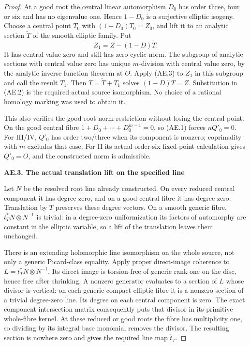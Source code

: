\begin{proof}
At a good root the central linear automorphism \(D_0\) has
order three, four or six and has no eigenvalue one. Hence
\(1-D_0\) is a surjective elliptic isogeny. Choose a central
point \(T_0\) with
\((1-D_0)T_0=Z_0\), and lift it to an analytic section
\(\widetilde T\) of the smooth elliptic family. Put
\[
 Z_1=Z-(1-D)\widetilde T.
\]
It has central value zero and still has zero cyclic norm.
The subgroup of analytic sections with central value zero has
unique \(m\)-division with central value zero, by the analytic
inverse function theorem at \(O\). Apply (AE.3) to \(Z_1\)
in this subgroup and call the result \(T_1\). Then
\(T=\widetilde T+T_1\) solves \((1-D)T=Z\). Substitution
in (AE.2) is the required actual source isomorphism. No choice
of a rational homology marking was used to obtain it.

This also verifies the good-root norm restriction without losing
the central point. On the good central fibre
\(1+D_0+\cdots+D_0^{m-1}=0\), so (AE.1) forces
\(nQ'_0=0\). For III/IV, \(Q'_0\) has order two/three
when its component is nonzero; coprimality with \(m\) excludes
that case. For II its actual order-six fixed-point calculation
gives \(Q'_0=O\), and the constructed norm is admissible.

\par

\medskip\noindent\textbf{AE.3. The actual translation lift on the specified line}

Let \(N\) be the resolved root line already constructed. On
every reduced central component it has degree zero, and on a
good central fibre it has degree zero. Translation by \(T\)
preserves these degree vectors. On a smooth generic fibre,
\(t_T^*N\otimes N^{-1}\) is trivial: in a degree-zero
uniformization its factors of automorphy are constant in the
elliptic variable, so a lift of the translation leaves them
unchanged.

There is an extending holomorphic line isomorphism on the whole
source, not only a generic Picard-class equality. Apply proper
direct-image coherence to
\(L=t_T^*N\otimes N^{-1}\). Its direct image is torsion-free
of generic rank one on the disc, hence free after shrinking.
A nonzero generator evaluates to a section of \(L\) whose
divisor is vertical: on each generic compact elliptic fibre it
is a nonzero section of a trivial degree-zero line. Its degree
on each central component is zero. The exact component
intersection matrix consequently puts that divisor in its
primitive whole-fibre kernel. At these reduced or good roots
the fibre has multiplicity one, so dividing by its integral
base monomial removes the divisor. The resulting section is
nowhere zero and gives the required line map \(\widetilde t_T\).


\end{proof}
